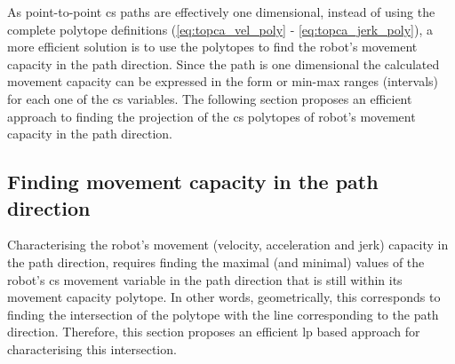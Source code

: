 As point-to-point \gls{cs} paths are effectively one dimensional, instead of using the complete polytope definitions (\ref{eq:topca_vel_poly} - \ref{eq:topca_jerk_poly}), a more efficient solution is to use the polytopes to find the robot's movement capacity in the path direction. Since the path is one dimensional the calculated movement capacity can be expressed in the form or min-max ranges (intervals) for each one of the \gls{cs} variables. 
The following section proposes an efficient approach to finding the projection of the \gls{cs} polytopes of robot's movement capacity in the path direction.

\subsection{Finding movement capacity in the path direction}
\label{ch:capacity_lp}

Characterising the robot's movement (velocity, acceleration and jerk) capacity in the path direction, requires finding the maximal (and minimal) values of the robot's \gls{cs} movement variable in the path direction that is still within its movement capacity polytope. In other words, geometrically, this corresponds to finding the intersection of the polytope with the line corresponding to the path direction. Therefore, this section proposes an efficient \gls{lp} based approach for characterising this intersection.

